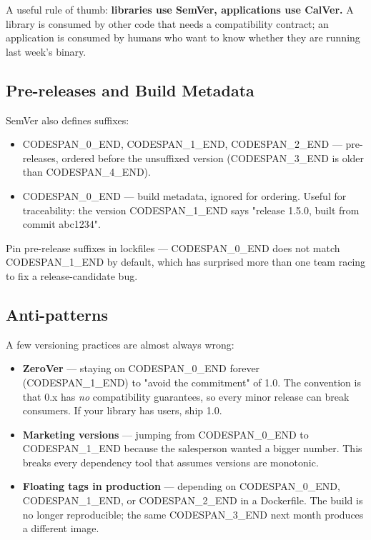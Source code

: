 \documentclass[11pt,a4paper]{book}
\begin{document}
A useful rule of thumb: \textbf{libraries use SemVer, applications use CalVer.} A library is consumed by other code that needs a compatibility contract; an application is consumed by humans who want to know whether they are running last week's binary.

\subsection{Pre-releases and Build Metadata}

SemVer also defines suffixes:

\begin{itemize}
  \item CODESPAN\_0\_END, CODESPAN\_1\_END, CODESPAN\_2\_END --- pre-releases, ordered before the unsuffixed version (CODESPAN\_3\_END is older than CODESPAN\_4\_END).
  \item CODESPAN\_0\_END --- build metadata, ignored for ordering. Useful for traceability: the version CODESPAN\_1\_END says "release 1.5.0, built from commit abc1234".
\end{itemize}

Pin pre-release suffixes in lockfiles --- CODESPAN\_0\_END does not match CODESPAN\_1\_END by default, which has surprised more than one team racing to fix a release-candidate bug.

\subsection{Anti-patterns}

A few versioning practices are almost always wrong:

\begin{itemize}
  \item \textbf{ZeroVer} --- staying on CODESPAN\_0\_END forever (CODESPAN\_1\_END) to "avoid the commitment" of 1.0. The convention is that 0.x has \textit{no} compatibility guarantees, so every minor release can break consumers. If your library has users, ship 1.0.
  \item \textbf{Marketing versions} --- jumping from CODESPAN\_0\_END to CODESPAN\_1\_END because the salesperson wanted a bigger number. This breaks every dependency tool that assumes versions are monotonic.
  \item \textbf{Floating tags in production} --- depending on CODESPAN\_0\_END, CODESPAN\_1\_END, or CODESPAN\_2\_END in a Dockerfile. The build is no longer reproducible; the same CODESPAN\_3\_END next month produces a different image.
\end{itemize}
\end{document}
